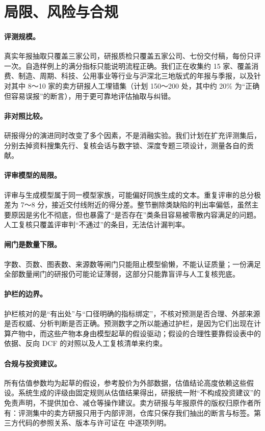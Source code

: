 \section{局限、风险与合规}
\label{sec:limits}

\paragraph{评测规模。}真实年报抽取只覆盖三家公司，研报质检只覆盖五家公司、七份交付稿，每份只评一次。自造样例上的满分指标只能说明流程正确。我们正在收集约 15 家、覆盖消费、制造、周期、科技、公用事业等行业与沪深北三地版式的年报与季报，以及针对其中 8～10 家的卖方研报人工埋错集（计划 150～200 处，其中约 20\% 为“正确但容易误报”的断言），用于更可靠地评估抽取与纠错。

\paragraph{非对照比较。}研报得分的演进同时改变了多个因素，不是消融实验。我们计划在扩充评测集后，分别去掉资料搜集先行、复核会话与数字锁、深度专题三项设计，测量各自的贡献。

\paragraph{评审模型的局限。}评审与生成模型属于同一模型家族，可能偏好同族生成的文本。重复评审的总分极差为 7～8 分，接近交付线附近的得分差。整节删除类缺陷的判出率偏低，虽然主要原因是劣化不彻底，但也暴露了“是否存在”类条目容易被零散内容满足的问题。人工复核只覆盖评审判“不通过”的条目，无法估计漏判率。

\paragraph{闸门是数量下限。}字数、页数、图表数、来源数等闸门只能阻止模型偷懒，不能认证质量；一份满足全部数量闸门的研报仍可能论证薄弱，这部分只能靠盲评与人工复核兜底。

\paragraph{护栏的边界。}护栏核对的是“有出处”与“口径明确的指标绑定”，不核对预测是否合理、外部来源是否权威、分析判断是否正确。预测数字之所以能通过护栏，是因为它们出现在计算产物中，而这些产物本身由模型起草的假设驱动；假设的合理性要靠假设表中的依据、反向 DCF 的对照以及人工复核清单来约束。

\paragraph{合规与投资建议。}所有估值参数均为起草的假设，参考股价为外部数据，估值结论高度依赖这些假设。系统生成的评级由固定规则从估值结果得出，研报统一附“不构成投资建议”的免责声明，不提供加仓、减仓等操作建议。卖方研报与年报原件的版权归原作者所有：评测集中的卖方研报只用于内部评测，仓库只保存我们抽出的断言与标签。第三方代码的参照关系、版本与许可证在  中逐项列明。
